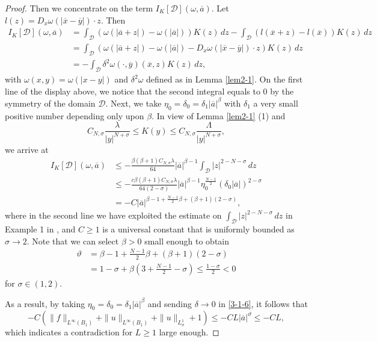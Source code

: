 \documentclass[11pt,reqno]{amsart}
\numberwithin{equation}{section}
\begin{document}
\begin{proof}
Then we concentrate on the term $I_K[\mathcal{D}](\omega,\overline{a})$. Let $l(z)=D_x\omega(|\overline{x}-\overline{y}|)\cdot z$. Then
\begin{align*}
I_K[\mathcal{D}](\omega,\overline{a})&=\int_{\mathcal{D}}(\omega(|\overline{a}+z|)-\omega(|\overline{a}|))K(z)\,dz-\int_{\mathcal{D}}
(l(\overline{x}+z)-l(\overline{x}))K(z)\,dz\\
&=\int_{\mathcal{D}}(\omega(|\overline{a}+z|)-\omega(|\overline{a}|)-D_x\omega(|\overline{x}-\overline{y}|)\cdot z)K(z)\,dz\\
&=-\int_{\mathcal{D}}\delta^2\omega(\cdot,\overline{y})(\overline{x},z)K(z)\,dz,
\end{align*}
with $\omega(x,y)=\omega(|x-y|)$ and $\delta^2\omega$ defined as in Lemma \ref{lem2-1}.
On the first line of the display above, we notice that the second integral equals to 0 by the symmetry of the domain $\mathcal{D}$. Next, we take $\eta_0=\delta_0=\delta_1|\overline{a}|^\beta$ with $\delta_1$ a very small positive number depending only upon $\beta$. In view of Lemma \ref{lem2-1} (1) and
$$
C_{N,\sigma}\frac{\lambda}{|y|^{N+\sigma}}\le K(y)\le C_{N,\sigma}\frac{\Lambda}{|y|^{N+\sigma}},
$$
we arrive at
\begin{align*}
I_K[\mathcal{D}](\omega,\overline{a})&\le -\frac{\beta(\beta+1)C_{N,\sigma}\lambda}{64}|\overline{a}|^{\beta-1}\int_{\mathcal{D}}|z|^{2-N-\sigma}\,dz\\
&\le-\frac{c\beta(\beta+1)C_{N,\sigma}\lambda}{64(2-\sigma)}|\overline{a}|^{\beta-1}\eta_0^\frac{N-1}{2}(\delta_0|\overline{a}|)^{2-\sigma}\\
&=-C|\overline{a}|^{\beta-1+\frac{N-1}{2}\beta+(\beta+1)(2-\sigma)},
\end{align*}
where in the second line we have exploited the estimate on $\int_{\mathcal{D}}|z|^{2-N-\sigma}\,dz$ in Example 1 in \cite{BCCI12}, and $C\ge1$ is a universal constant that is uniformly bounded as $\sigma\rightarrow2$. Note that we can select $\beta>0$ small enough to obtain
\begin{align*}
\vartheta&=\beta-1+\frac{N-1}{2}\beta+(\beta+1)(2-\sigma)\\
&=1-\sigma+\beta\left(3+\frac{N-1}{2}-\sigma\right)\le \frac{1-\sigma}{2}<0
\end{align*}
for $\sigma\in(1,2)$.

As a result, by taking $\eta_0=\delta_0=\delta_1|\overline{a}|^\beta$ and sending $\delta\rightarrow0$ in \eqref{3-1-6}, it follows that
$$
-C(\|f\|_{L^\infty(B_1)}+\|u\|_{L^\infty(B_1)}+\|u\|_{L^1_\sigma}+1)\le -CL|\overline{a}|^\vartheta\le -CL,
$$
which indicates a contradiction for $L\ge1$ large enough.


\end{proof}
\end{document}
